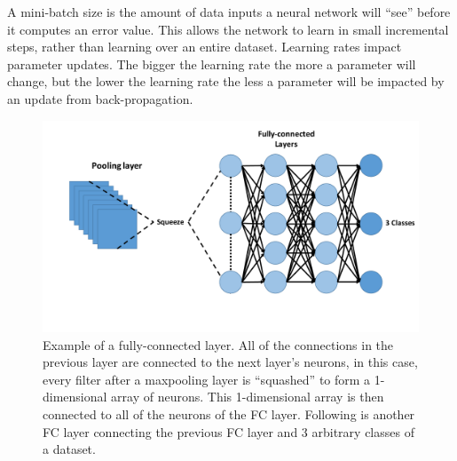 \documentclass{osa-article}
\begin{document}
A mini-batch size is the amount of data inputs a neural network will ``see'' before it computes an error value. This allows the network to learn in small incremental steps, rather than learning over an entire dataset. Learning rates impact parameter updates. The bigger the learning rate the more a parameter will change, but the lower the learning rate the less a parameter will be impacted by an update from back-propagation.
\begin{figure}[!ht]
\centering
\includegraphics[width=1\linewidth]{fc}
\caption{Example of a fully-connected layer. All of the connections in the previous layer are connected to the next layer's neurons, in this case, every filter after a maxpooling layer is ``squashed'' to form a 1-dimensional array of neurons. This 1-dimensional array is then connected to all of the neurons of the FC layer. Following is another FC layer connecting the previous FC layer and 3 arbitrary classes of a dataset. }\label{fc_layer}
\end{figure}
%
\end{document}
